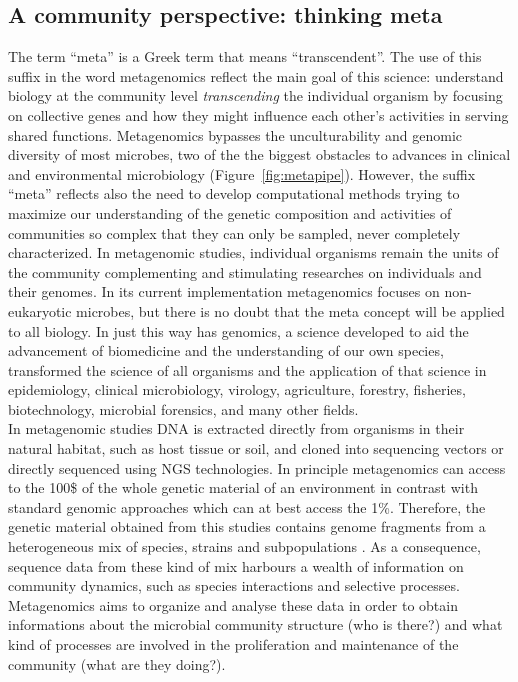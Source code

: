 \subsection{A community perspective: thinking meta}
The term ``meta'' is a Greek term that means ``transcendent''. The use of this suffix in the word metagenomics reflect the main goal of this science: understand biology at the community level \textit{transcending} the individual organism by focusing on collective genes and how they might influence each other’s activities in serving shared functions. Metagenomics bypasses the unculturability and genomic diversity of most microbes, two of the the biggest obstacles to advances in clinical and environmental microbiology (Figure~\ref{fig:metapipe}). However, the suffix ``meta'' reflects also the need to develop computational methods trying to maximize our understanding of the genetic composition and activities of communities so complex that they can only be sampled, never completely characterized. In metagenomic studies, individual organisms remain the units of the community complementing and stimulating researches on individuals and their genomes. In its current implementation metagenomics focuses on non-eukaryotic microbes, but there is no doubt that the meta concept will be applied to all biology. In just this way has genomics, a science developed to aid the advancement of biomedicine and the understanding of our own species, transformed the science of all organisms and the application of that science in epidemiology, clinical microbiology, virology, agriculture, forestry, fisheries, biotechnology, microbial forensics, and many other fields.\\
In metagenomic studies DNA is extracted directly from organisms in their natural habitat, such as host tissue or soil, and cloned into sequencing vectors or directly sequenced using NGS technologies. In principle metagenomics can access to the 100\$ of the whole genetic material of an environment in contrast with standard genomic approaches which can at best access the 1\%. Therefore, the genetic material obtained from this studies contains genome fragments from a heterogeneous mix of species, strains and subpopulations \cite{tringe2005metagenomics}. As a consequence, sequence data from these kind of mix harbours a wealth of information on community dynamics, such as species interactions and selective processes. Metagenomics aims to organize and analyse these data in order to obtain informations about the microbial community structure (who is there?) and what kind of processes are involved in the proliferation and maintenance of the community (what are they doing?).\\
